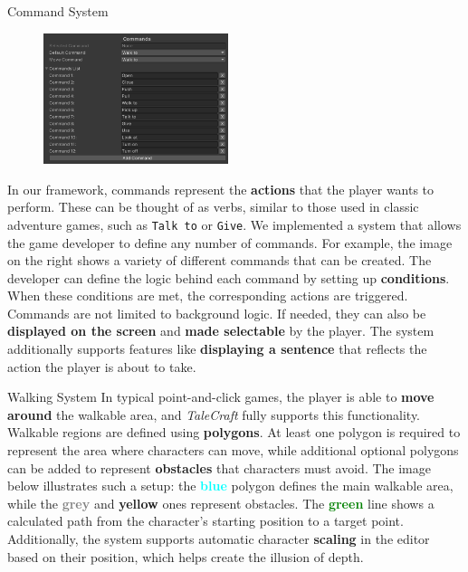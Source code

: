 \documentclass[portrait,a0paper,fontscale=0.35]{baposter}
\begin{document}
\begin{poster}
\begin{posterbox}[column=0, span=1, name=cs, below=architecture]{Command System}

\begin{figure}
\centering
\includegraphics[width=0.48\textwidth]{img/image_2025-07-04_190803886.png}
\end{figure}

In our framework, commands represent the \textbf{actions} that the player wants to perform. These can be thought of as verbs, similar to those used in classic adventure games, such as \texttt{Talk to} or \texttt{Give}. We implemented a system that allows the game developer to define any number of commands. For example, the image on the right shows a variety of different commands that can be created. The developer can define the logic behind each command by setting up \textbf{conditions}. When these conditions are met, the corresponding actions are triggered. Commands are not limited to background logic. If needed, they can also be \textbf{displayed on the screen} and \textbf{made selectable} by the player. The system additionally supports features like \textbf{displaying a sentence} that reflects the action the player is about to take.

\end{posterbox}

\begin{posterbox}[column=0, span=1, name=ws, below=cs]{Walking System}
In typical point-and-click games, the player is able to \textbf{move around} the walkable area, and \textit{TaleCraft} fully supports this functionality. Walkable regions are defined using \textbf{polygons}. At least one polygon is required to represent the area where characters can move, while additional optional polygons can be added to represent \textbf{obstacles} that characters must avoid. The image below illustrates such a setup: the \textcolor{cyan}{\textbf{blue}} polygon defines the main walkable area, while the \textcolor{gray}{\textbf{grey}} and \textcolor{Dandelion}{\textbf{yellow}} ones represent obstacles. The \textcolor{green}{\textbf{green}} line shows a calculated path from the character's starting position to a target point. Additionally, the system supports automatic character \textbf{scaling} in the editor based on their position, which helps create the illusion of depth. 


\end{posterbox}
\end{poster}
\end{document}
